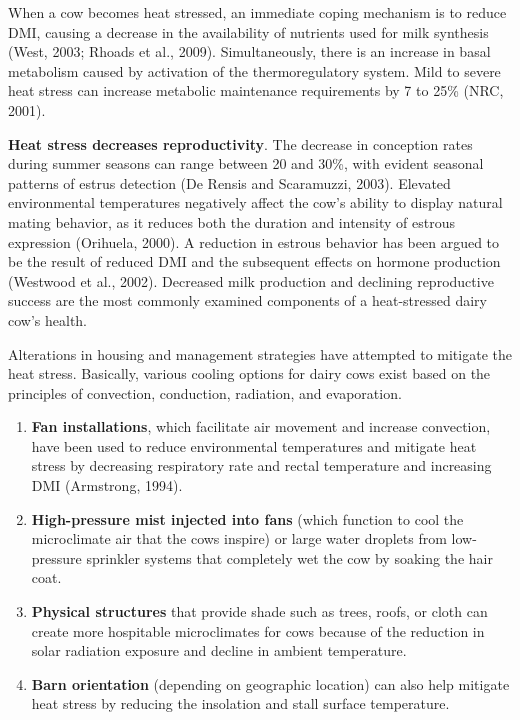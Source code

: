 \documentclass[]{book}
\begin{document}
When a cow becomes heat stressed, an immediate coping mechanism is to reduce DMI, causing a decrease in the availability of nutrients used for milk synthesis (West, 2003; Rhoads et al., 2009). Simultaneously, there is an increase in basal metabolism caused by activation of the thermoregulatory system. Mild to severe heat stress can increase metabolic maintenance requirements by 7 to 25\% (NRC, 2001).

\textbf{Heat stress decreases reproductivity}. The decrease in conception rates during summer seasons can range between 20 and 30\%, with evident seasonal patterns of estrus detection (De Rensis and Scaramuzzi, 2003). Elevated environmental temperatures negatively affect the cow's ability to display natural mating behavior, as it reduces both the duration and intensity of estrous expression (Orihuela, 2000). A reduction in estrous behavior has been argued to be the result of reduced DMI and the subsequent effects on hormone production (Westwood et al., 2002).
Decreased milk production and declining reproductive success are the most commonly examined components of a heat-stressed dairy cow's health.

Alterations in housing and management strategies have attempted to mitigate the heat stress. Basically, various cooling options for dairy cows exist based on the principles of convection, conduction, radiation, and evaporation.

\begin{enumerate}
\def\labelenumi{\arabic{enumi}.}
\item
  \textbf{Fan installations}, which facilitate air movement and increase convection, have been used to reduce environmental temperatures and mitigate heat stress by decreasing respiratory rate and rectal temperature and increasing DMI (Armstrong, 1994).
\item
  \textbf{High-pressure mist injected into fans} (which function to cool the microclimate air that the cows inspire) or large water droplets from low-pressure sprinkler systems that completely wet the cow by soaking the hair coat.
\item
  \textbf{Physical structures} that provide shade such as trees, roofs, or cloth can create more hospitable microclimates for cows because of the reduction in solar radiation exposure and decline in ambient temperature.
\item
  \textbf{Barn orientation} (depending on geographic location) can also help mitigate heat stress by reducing the insolation and stall surface temperature.
\end{enumerate}
\end{document}
